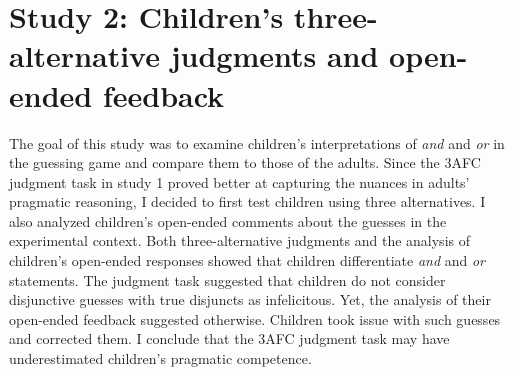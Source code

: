 \documentclass[oneside]{report}
\theoremstyle{definition}
\theoremstyle{definition}
\theoremstyle{definition}
\theoremstyle{remark}
\begin{document}
\section{Study 2: Children's three-alternative judgments and open-ended
feedback}\label{study-2-childrens-three-alternative-judgments-and-open-ended-feedback}

The goal of this study was to examine children's interpretations of
\emph{and} and \emph{or} in the guessing game and compare them to those
of the adults. Since the 3AFC judgment task in study 1 proved better at
capturing the nuances in adults' pragmatic reasoning, I decided to first
test children using three alternatives. I also analyzed children's
open-ended comments about the guesses in the experimental context. Both
three-alternative judgments and the analysis of children's open-ended
responses showed that children differentiate \emph{and} and \emph{or}
statements. The judgment task suggested that children do not consider
disjunctive guesses with true disjuncts as infelicitous. Yet, the
analysis of their open-ended feedback suggested otherwise. Children took
issue with such guesses and corrected them. I conclude that the 3AFC
judgment task may have underestimated children's pragmatic competence.
\end{document}

